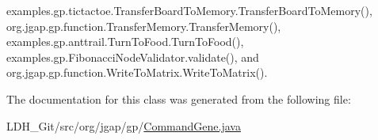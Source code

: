 examples.\-gp.\-tictactoe.\-Transfer\-Board\-To\-Memory.\-Transfer\-Board\-To\-Memory(), org.\-jgap.\-gp.\-function.\-Transfer\-Memory.\-Transfer\-Memory(), examples.\-gp.\-anttrail.\-Turn\-To\-Food.\-Turn\-To\-Food(), examples.\-gp.\-Fibonacci\-Node\-Validator.\-validate(), and org.\-jgap.\-gp.\-function.\-Write\-To\-Matrix.\-Write\-To\-Matrix().



The documentation for this class was generated from the following file\-:\begin{DoxyCompactItemize}
\item 
L\-D\-H\-\_\-\-Git/src/org/jgap/gp/\hyperlink{_command_gene_8java}{Command\-Gene.\-java}\end{DoxyCompactItemize}
